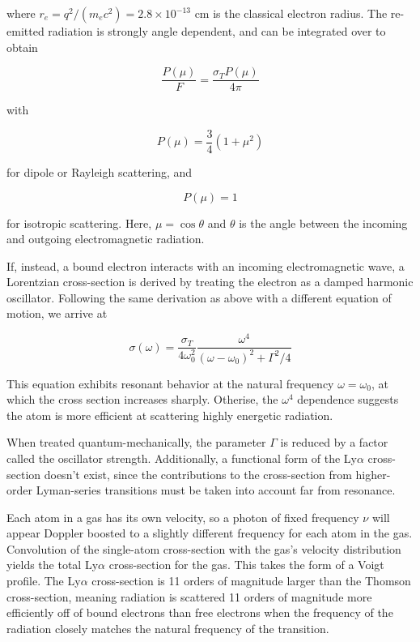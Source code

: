 \documentclass[onecolumn]{aastex63}
\begin{document}
where $r_e = q^2 / (m_ec^2)  = 2.8 \times 10^{-13}$ cm is the classical electron radius. The re-emitted radiation is strongly angle dependent, and can be integrated over to obtain

\begin{equation}
    \frac{P(\mu)}{F} = \frac{\sigma_T P(\mu)}{4\pi}
\end{equation}

 \noindent with
 
\begin{equation}
    P(\mu) = \frac{3}{4}(1 + \mu^2)
\end{equation}

\noindent for dipole or Rayleigh scattering, and 

\begin{equation}
    P(\mu) = 1
\end{equation}

for isotropic scattering. Here, $\mu = \cos{\theta}$ and $\theta$ is the angle between the incoming and outgoing electromagnetic radiation.

If, instead, a bound electron interacts with an incoming electromagnetic wave, a Lorentzian cross-section is derived by treating the electron as a damped harmonic oscillator. Following the same derivation as above with a different equation of motion, we arrive at 

\begin{equation}
    \sigma(\omega) = \frac{\sigma_T}{4\omega_0^2} \frac{\omega^4}{(\omega-\omega_0)^2 + \Gamma^2/4}
\end{equation}

This equation exhibits resonant behavior at the natural frequency $\omega = \omega_0$, at which the cross section increases sharply. Otherise, the $\omega^4$ dependence suggests the atom is more efficient at scattering highly energetic radiation.

When treated quantum-mechanically, the parameter $\Gamma$ is reduced by a factor called the oscillator strength. Additionally, a functional form of the Ly$\alpha$ cross-section doesn't exist, since the contributions to the cross-section from higher-order Lyman-series transitions must be taken into account far from resonance.

Each atom in a gas has its own velocity, so a photon of fixed frequency $\nu$ will appear Doppler boosted to a slightly different frequency for each atom in the gas. Convolution of the single-atom cross-section with the gas's velocity distribution yields the total Ly$\alpha$ cross-section for the gas. This takes the form of a Voigt profile. The Ly$\alpha$ cross-section is 11 orders of magnitude larger than the Thomson cross-section, meaning radiation is scattered 11 orders of magnitude more efficiently off of bound electrons than free electrons when the frequency of the radiation closely matches the natural frequency of the transition.
\end{document}
